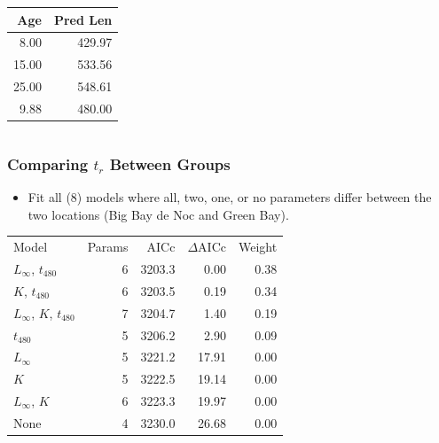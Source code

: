 \documentclass[xcolor=dvipsnames]{beamer}\usepackage[]{graphicx}\usepackage[]{color}
\begin{document}
\begin{frame}[fragile, t]
\begin{columns}
\begin{column}{0.5\textwidth}
\smallskip
\begin{table}[ht]
\centering
\begin{tabular}{rr}
  \hline
Age & Pred Len \\ 
  \hline
8.00 & 429.97 \\ 
  15.00 & 533.56 \\ 
  25.00 & 548.61 \\ 
  9.88 & 480.00 \\ 
   \hline
\end{tabular}
\end{table}

\end{column}
\end{columns}
\end{frame}




\begin{frame}[fragile, t]
\frametitle{Comparing $t_{r}$ Between Groups}
\begin{itemize}
  \item Fit all (8) models where all, two, one, or no parameters differ between the two locations (Big Bay de Noc and Green Bay).
\end{itemize}
\pause
\bigskip
\begin{table}[ht]
\centering
\begin{tabular}{lrrrr}
  \hline
Model & Params & AICc & $\Delta$AICc & Weight \\ 
  \rowcolor{light-gray} \hline
$L_{\infty}$, $t_{480}$ & 6 & 3203.3 & 0.00 & 0.38 \\ 
   \rowcolor{light-gray}$K$, $t_{480}$ & 6 & 3203.5 & 0.19 & 0.34 \\ 
   \rowcolor{light-gray}$L_{\infty}$, $K$, $t_{480}$ & 7 & 3204.7 & 1.40 & 0.19 \\ 
   \rowcolor{light-gray}$t_{480}$ & 5 & 3206.2 & 2.90 & 0.09 \\ 
  $L_{\infty}$ & 5 & 3221.2 & 17.91 & 0.00 \\ 
  $K$ & 5 & 3222.5 & 19.14 & 0.00 \\ 
  $L_{\infty}$, $K$ & 6 & 3223.3 & 19.97 & 0.00 \\ 
  None & 4 & 3230.0 & 26.68 & 0.00 \\ 
   \hline
\end{tabular}
\end{table}

\end{frame}
\end{document}
